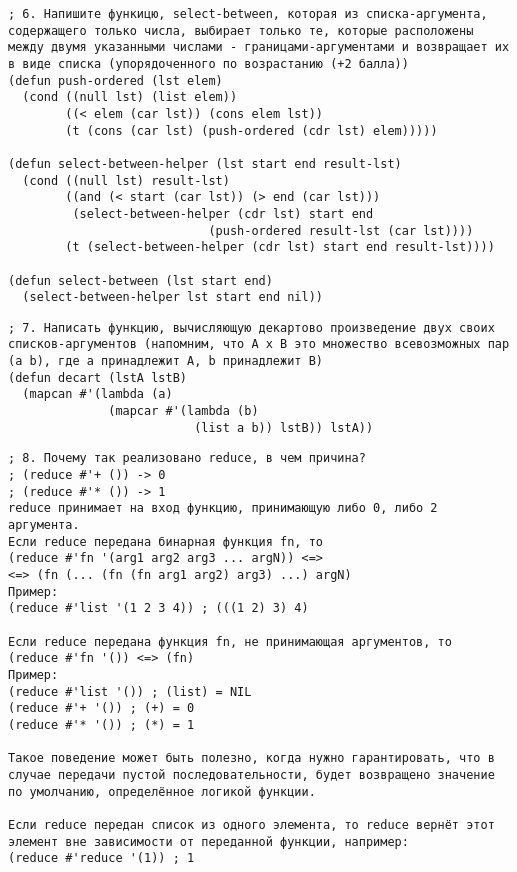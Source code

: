 \documentclass[a4paper,oneside,14pt]{extarticle}
\begin{document}
\begin{lstlisting}
; 6. Напишите функицю, select-between, которая из списка-аргумента, содержащего только числа, выбирает только те, которые расположены между двумя указанными числами - границами-аргументами и возвращает их в виде списка (упорядоченного по возрастанию (+2 балла))
(defun push-ordered (lst elem)
  (cond ((null lst) (list elem))
        ((< elem (car lst)) (cons elem lst))
        (t (cons (car lst) (push-ordered (cdr lst) elem)))))

(defun select-between-helper (lst start end result-lst)
  (cond ((null lst) result-lst)
        ((and (< start (car lst)) (> end (car lst)))
         (select-between-helper (cdr lst) start end
                            (push-ordered result-lst (car lst))))
        (t (select-between-helper (cdr lst) start end result-lst))))

(defun select-between (lst start end)
  (select-between-helper lst start end nil))
\end{lstlisting}

\begin{lstlisting}
; 7. Написать функцию, вычисляющую декартово произведение двух своих списков-аргументов (напомним, что A x B это множество всевозможных пар (a b), где a принадлежит A, b принадлежит B)
(defun decart (lstA lstB)
  (mapcan #'(lambda (a)
              (mapcar #'(lambda (b)
                          (list a b)) lstB)) lstA))
\end{lstlisting}

\begin{lstlisting}
; 8. Почему так реализовано reduce, в чем причина?
; (reduce #'+ ()) -> 0
; (reduce #'* ()) -> 1
reduce принимает на вход функцию, принимающую либо 0, либо 2 аргумента.
Если reduce передана бинарная функция fn, то
(reduce #'fn '(arg1 arg2 arg3 ... argN)) <=>
<=> (fn (... (fn (fn arg1 arg2) arg3) ...) argN)
Пример:
(reduce #'list '(1 2 3 4)) ; (((1 2) 3) 4)

Если reduce передана функция fn, не принимающая аргументов, то
(reduce #'fn '()) <=> (fn)
Пример:
(reduce #'list '()) ; (list) = NIL
(reduce #'+ '()) ; (+) = 0
(reduce #'* '()) ; (*) = 1

Такое поведение может быть полезно, когда нужно гарантировать, что в случае передачи пустой последовательности, будет возвращено значение по умолчанию, определённое логикой функции.

Если reduce передан список из одного элемента, то reduce вернёт этот элемент вне зависимости от переданной функции, например:
(reduce #'reduce '(1)) ; 1
\end{lstlisting}
\end{document}
